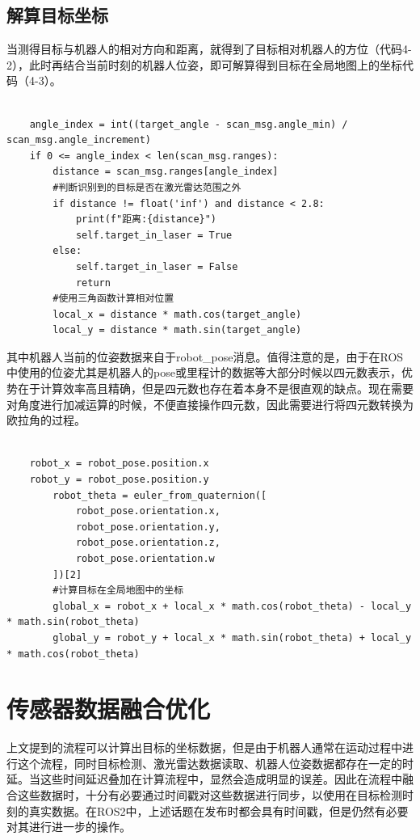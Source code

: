 \subsection{解算目标坐标}
当测得目标与机器人的相对方向和距离，就得到了目标相对机器人的方位（代码4-2），此时再结合当前时刻的机器人位姿，即可解算得到目标在全局地图上的坐标代码（4-3）。
\begin{lstlisting}[caption={计算目标相对机器人的方位}]
    
    angle_index = int((target_angle - scan_msg.angle_min) / scan_msg.angle_increment)
    if 0 <= angle_index < len(scan_msg.ranges):
        distance = scan_msg.ranges[angle_index]
        #判断识别到的目标是否在激光雷达范围之外
        if distance != float('inf') and distance < 2.8:
            print(f"距离:{distance}")
            self.target_in_laser = True
        else:
            self.target_in_laser = False
            return
        #使用三角函数计算相对位置
        local_x = distance * math.cos(target_angle)
        local_y = distance * math.sin(target_angle)

\end{lstlisting}
其中机器人当前的位姿数据来自于robot\_pose消息。值得注意的是，由于在ROS中使用的位姿尤其是机器人的pose或里程计的数据等大部分时候以四元数表示，优势在于计算效率高且精确，但是四元数也存在着本身不是很直观的缺点。现在需要对角度进行加减运算的时候，不便直接操作四元数，因此需要进行将四元数转换为欧拉角的过程。

\begin{lstlisting}[caption={计算目标相对机器人的方位}]
    
    robot_x = robot_pose.position.x
    robot_y = robot_pose.position.y
        robot_theta = euler_from_quaternion([
            robot_pose.orientation.x,
            robot_pose.orientation.y,
            robot_pose.orientation.z,
            robot_pose.orientation.w
        ])[2]
        #计算目标在全局地图中的坐标
        global_x = robot_x + local_x * math.cos(robot_theta) - local_y * math.sin(robot_theta)
        global_y = robot_y + local_x * math.sin(robot_theta) + local_y * math.cos(robot_theta)
\end{lstlisting}

\section{传感器数据融合优化}
上文提到的流程可以计算出目标的坐标数据，但是由于机器人通常在运动过程中进行这个流程，同时目标检测、激光雷达数据读取、机器人位姿数据都存在一定的时延。当这些时间延迟叠加在计算流程中，显然会造成明显的误差。因此在流程中融合这些数据时，十分有必要通过时间戳对这些数据进行同步，以使用在目标检测时刻的真实数据。在ROS2中，上述话题在发布时都会具有时间戳，但是仍然有必要对其进行进一步的操作。
